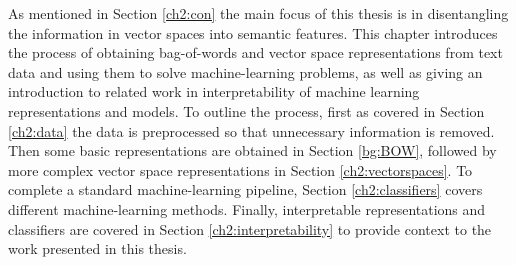 







As mentioned in Section \ref{ch2:con} the main focus of this thesis is in disentangling the information in vector spaces into semantic features. This chapter introduces the process of obtaining bag-of-words and vector space representations from text data and using them to solve machine-learning problems, as well as giving an introduction to related work in interpretability of machine learning representations and models. To outline the process, first as covered in Section \ref{ch2:data} the data is preprocessed so that unnecessary information is removed. Then some basic representations are obtained in Section \ref{bg:BOW}, followed by more complex vector space representations in Section \ref{ch2:vectorspaces}. To complete a standard machine-learning pipeline, Section \ref{ch2:classifiers} covers different machine-learning methods. Finally, interpretable representations and classifiers are covered in Section \ref{ch2:interpretability} to provide context to the work presented in this thesis.


